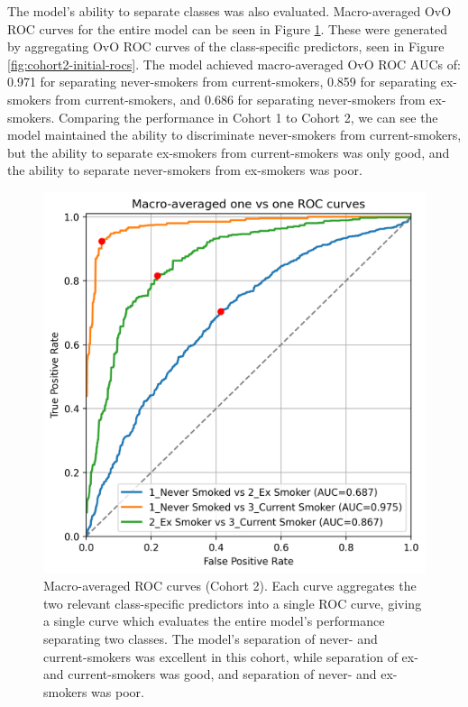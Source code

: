 \documentclass{article} %
\begin{document}
The model's ability to separate classes was also evaluated. Macro-averaged OvO ROC curves for the entire model can be seen in Figure \ref{fig:cohort2-macro-rocs}. These were generated by aggregating OvO ROC curves of the class-specific predictors, seen in Figure \ref{fig:cohort2-initial-rocs}. The model achieved macro-averaged OvO ROC AUCs of: 0.971 for separating never-smokers from current-smokers, 0.859 for separating ex-smokers from current-smokers, and 0.686 for separating never-smokers from ex-smokers. Comparing the performance in Cohort 1 to Cohort 2, we can see the model maintained the ability to discriminate never-smokers from current-smokers, but the ability to separate ex-smokers from current-smokers was only good, and the ability to separate never-smokers from ex-smokers was poor.

\begin{figure}[htb]
    \centering
    \includegraphics[width=0.9\linewidth]{cohort2/test_macro_ovo_roc.png}
    \caption[Macro-averaged ROC curves (Cohort 2)]{Macro-averaged ROC curves (Cohort 2). Each curve aggregates the two relevant class-specific predictors into a single ROC curve, giving a single curve which evaluates the entire model's performance separating two classes. The model's separation of never- and current-smokers was excellent in this cohort, while separation of ex- and current-smokers was good, and separation of never- and ex-smokers was poor.}
    \label{fig:cohort2-macro-rocs}
\end{figure}
\end{document}
